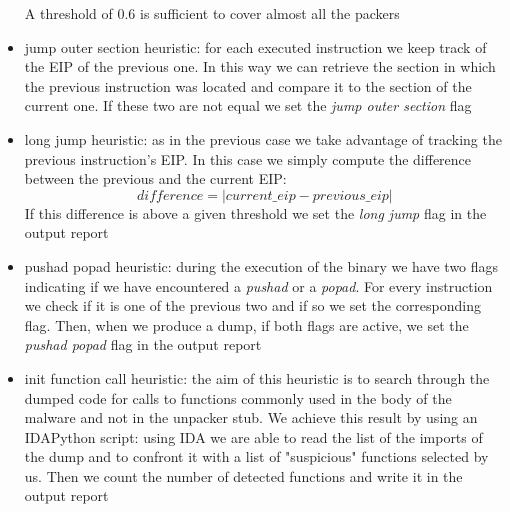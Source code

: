 \begin{itemize}
\begin{figure}[!ht]
\end{figure}
A threshold of 0.6 is sufficient to cover almost all the packers
\item jump outer section heuristic: for each executed instruction we keep track of the \ac{EIP} of the previous one. In this way we can retrieve the section in which the previous instruction was located and compare it to the section of the current one. If these two are not equal we set the \textit{jump outer section} flag
\item long jump heuristic: as in the previous case we take advantage of tracking the previous instruction's \ac{EIP}. In this case we simply compute the difference between the previous and the current \ac{EIP}: 
\begin{equation}
difference = \left|current\_eip - previous\_eip\right|
\end{equation}
If this difference is above a given threshold we set the \textit{long jump} flag in the output report
 \item pushad popad heuristic: during the execution of the binary we have two flags indicating if we have encountered a \textit{pushad} or a \textit{popad}. For every instruction we check if it is one of the previous two and if so we set the corresponding flag. Then, when we produce a dump, if both flags are active, we set the \textit{pushad popad} flag in the output report
\item init function call heuristic: the aim of this heuristic is to search through the dumped code for calls to functions commonly used in the body of the malware and not in the unpacker stub. We achieve this result by using an IDAPython script: using IDA we are able to read the list of the imports of the dump and to confront it with a list of "suspicious" functions selected by us. Then we count the number of detected functions and write it in the output report
\end{itemize} 

